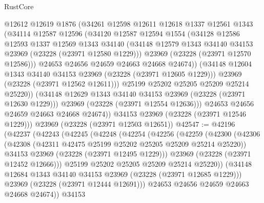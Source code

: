 \begin{lexlean}{RustCore}
\begin{coremodule}
                @12612
                @12619
                @1876
                (@34261
                  @12598
                  @12611
                  @12618
                  @1337
                  @12561
                  @1343
                  (@34114
                    @12587
                    @12596
                    (@34120
                      @12587
                      @12594
                      @1554
                      (@34128
                        @12586
                        @12593
                        @1337
                        @12569
                        @1343
                        @34140
                        (@34148 @12579 @1343 @34140 @34153 @23969 (@23228 (@23971 @12580 @1229)))
                        @23969
                        (@23228 (@23971 @12570 @12586)))
                      @24653
                      @24656
                      @24659
                      @24663
                      @24668
                      @24674))
                  (@34148 @12604 @1343 @34140 @34153 @23969 (@23228 (@23971 @12605 @1229)))
                  @23969
                  (@23228 (@23971 @12562 @12611)))
                @25199
                @25202
                @25205
                @25209
                @25214
                @25220))
            (@34148 @12629 @1343 @34140 @34153 @23969 (@23228 (@23971 @12630 @1229)))
            @23969
            (@23228 (@23971 @12554 @12636)))
          @24653
          @24656
          @24659
          @24663
          @24668
          @24674))
      @34153
      @23969
      (@23228 (@23971 @12546 @1229)))
    @23969
    (@23228 (@23971 @12503 @12651))
@42547 := @42196
    (@42237
      (@42243
        (@42245
          (@42248
            (@42254
              (@42256
                (@42259
                  (@42300
                    (@42306
                      (@42308 (@42311 @42475 @25199 @25202 @25205 @25209 @25214 @25220))
                      @34153
                      @23969
                      (@23228 (@23971 @12495 @1229)))
                    @23969
                    (@23228 (@23971 @12452 @12666)))
                  @25199
                  @25202
                  @25205
                  @25209
                  @25214
                  @25220))
              (@34148 @12684 @1343 @34140 @34153 @23969 (@23228 (@23971 @12685 @1229)))
              @23969
              (@23228 (@23971 @12444 @12691)))
            @24653
            @24656
            @24659
            @24663
            @24668
            @24674))
        @34153

\end{coremodule}
\end{lexlean}
